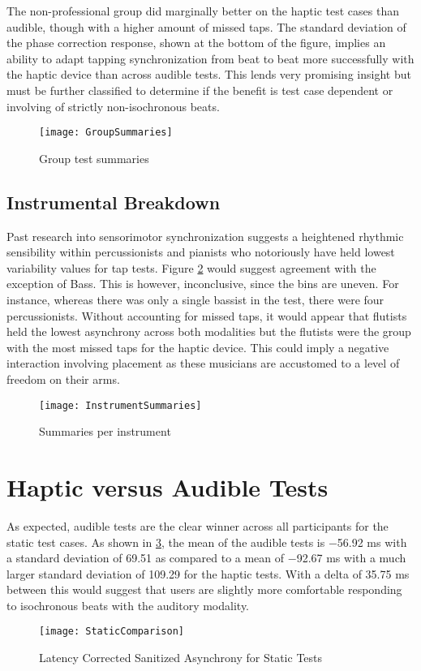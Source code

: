 The non-professional group did marginally better on the haptic test cases than audible, though with a higher amount of missed taps. The standard deviation of the phase correction response, shown at the bottom of the figure, implies an ability to adapt tapping synchronization from beat to beat more successfully with the haptic device than across audible tests. This lends very promising insight but must be further classified to determine if the benefit is test case dependent or involving of strictly non-isochronous beats.
\begin{figure}[H]
    \centering
    \texttt{[image: GroupSummaries]}
    \caption{Group test summaries}
    \label{fig:GroupSummaries}
\end{figure}
\subsection{Instrumental Breakdown}

Past research into sensorimotor synchronization suggests a heightened rhythmic sensibility within percussionists and pianists who notoriously have held lowest variability values for tap tests. Figure \ref{fig:InstrumentSummaries} would suggest agreement with the exception of Bass. This is however, inconclusive, since the bins are uneven. For instance, whereas there was only a single bassist in the test, there were four percussionists. Without accounting for missed taps, it would appear that flutists held the lowest asynchrony across both modalities but the flutists were the group with the most missed taps for the haptic device. This could imply a negative interaction involving placement as these musicians are accustomed to a level of freedom on their arms.

\begin{figure}[H]
    \centering
    \texttt{[image: InstrumentSummaries]}
    \caption{Summaries per instrument}
    \label{fig:InstrumentSummaries}
\end{figure}

\section{Haptic versus Audible Tests}
As expected, audible tests are the clear winner across all participants for the static test cases. As shown in \ref{fig:StaticComparison}, the mean of the audible tests is $-$56.92 ms with a standard deviation of 69.51 as compared to a mean of $-$92.67 ms with a much larger standard deviation of 109.29 for the haptic tests. With a delta of 35.75 ms between this would suggest that users are slightly more comfortable responding to isochronous beats with the auditory modality.
\begin{figure}[H]
    \centering
    \texttt{[image: StaticComparison]}
    \caption{Latency Corrected Sanitized Asynchrony for Static Tests}
    \label{fig:StaticComparison}
\end{figure}

